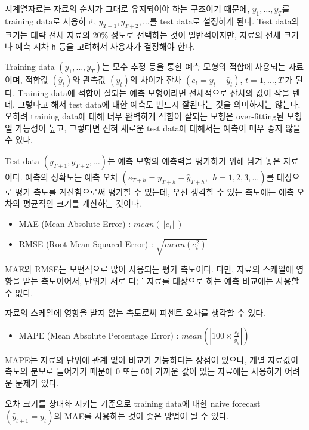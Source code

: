 \documentclass[
]{book}
\providecommand{\tightlist}{%
  \setlength{\itemsep}{0pt}\setlength{\parskip}{0pt}}
\begin{document}
시계열자료는 자료의 순서가 그대로 유지되어야 하는 구조이기 때문에, \(y_{1}, \ldots, y_{T}\)를 training data로 사용하고, \(y_{T+1}, y_{T+2}, \ldots\)를 test data로 설정하게 된다. Test data의 크기는 대략 전체 자료의 20\% 정도로 선택하는 것이 일반적이지만, 자료의 전체 크기나 예측 시차 \texttt{h} 등을 고려해서 사용자가 결정해야 한다.

Training data \((y_{1}, \ldots, y_{T})\)는 모수 추정 등을 통한 예측 모형의 적합에 사용되는 자료이며, 적합값 \((\hat{y}_{t})\)와 관측값 \((y_{t})\)의 차이가 잔차 \((e_{t} = y_{t} - \hat{y}_{t})\), \(t=1,\ldots, T~\)가 된다. Training data에 적합이 잘되는 예측 모형이라면 전체적으로 잔차의 값이 작을 텐데, 그렇다고 해서 test data에 대한 예측도 반드시 잘된다는 것을 의미하지는 않는다. 오히려 training data에 대해 너무 완벽하게 적합이 잘되는 모형은 over-fitting된 모형일 가능성이 높고, 그렇다면 전혀 새로운 test data에 대해서는 예측이 매우 좋지 않을 수 있다.

Test data \((y_{T+1}, y_{T+2}, \ldots)\)는 예측 모형의 예측력을 평가하기 위해 남겨 놓은 자료이다. 예측의 정확도는 예측 오차 \((e_{T+h} = y_{T+h} - \hat{y}_{T+h}, ~~h=1, 2, 3, \ldots)\)를 대상으로 평가 측도를 계산함으로써 평가할 수 있는데, 우선 생각할 수 있는 측도에는 예측 오차의 평균적인 크기를 계산하는 것이다.

\begin{itemize}
\item
  MAE (Mean Absolute Error) : \(mean(~|e_{t}|~)\)
\item
  RMSE (Root Mean Squared Error) : \(\sqrt{mean(e_{t}^{2})}\)
\end{itemize}

MAE와 RMSE는 보편적으로 많이 사용되는 평가 측도이다. 다만, 자료의 스케일에 영향을 받는 측도이어서, 단위가 서로 다른 자료를 대상으로 하는 예측 비교에는 사용할 수 없다.

자료의 스케일에 영향을 받지 않는 측도로써 퍼센트 오차를 생각할 수 있다.

\begin{itemize}
\tightlist
\item
  MAPE (Mean Absolute Percentage Error) : \(mean(|100 \times \frac{e_{t}}{y_{y}}|)\)
\end{itemize}

MAPE는 자료의 단위에 관계 없이 비교가 가능하다는 장점이 있으나, 개별 자료값이 측도의 분모로 들어가기 때문에 0 또는 0에 가까운 값이 있는 자료에는 사용하기 어려운 문제가 있다.

오차 크기를 상대화 시키는 기준으로 training data에 대한 naive forecast \((\hat{y}_{t+1} = y_{t})\)의 MAE를 사용하는 것이 좋은 방법이 될 수 있다.
\end{document}
